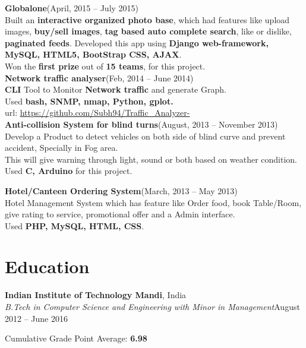 \documentclass[a4paper,margin,line]{resume}
\begin{document}
\begin{resume}
	\textbf{Globalone}\hfill(April, 2015 -- July 2015)\vspace{1.0mm}\\%
	Built an \textbf{interactive organized photo base}, which had features like upload images, \textbf{buy/sell images}, \textbf{tag based auto complete search}, like or dislike, \textbf{paginated feeds}. Developed this app using \textbf{Django web-framework, MySQL, HTML5, BootStrap CSS, AJAX}.\\ Won the \textbf{first prize} out of \textbf{15 teams}, for this project.\\%

	\textbf{Network traffic analyser}\hfill (Feb, 2014 -- June 2014)\vspace{1.0mm}\\%
	\textbf{CLI} Tool to Monitor \textbf{Network traffic} and generate Graph.\\
	Used \textbf{bash, SNMP, nmap, Python, gplot.}\\ 
	url: \url{https://github.com/Subh94/Traffic_Analyzer-}\\


	\textbf{Anti-collision System for blind turns}\hfill (August, 2013 -- November 2013)\vspace{1.0mm}\\%
	Develop a Product to detect vehicles on both side of blind curve and prevent accident, Specially in Fog area.\\
	This will give warning through light, sound or both based on weather condition.\\
	Used\textbf{ C, Arduino} for this project.%
	
	\textbf{Hotel/Canteen Ordering System}\hfill (March, 2013 -- May 2013)\vspace{1.0mm}\\
	Hotel Management System which has feature like Order food, book Table/Room, give rating to service, promotional offer and a Admin interface.\\
	Used\textbf{ PHP, MySQL, HTML, CSS}.%
	
	\section{\mysidestyle Education}

	\textbf{Indian Institute of Technology Mandi}, India\\%
	\textsl{B.Tech in Computer Science and Engineering with Minor in Management}\hfill August 2012 -- June 2016\vspace{-3mm}\\%
	\begin{list2}%
		\item Cumulative Grade Point Average: \textbf{6.98}%
	\end{list2}


\end{resume}
\end{document}
